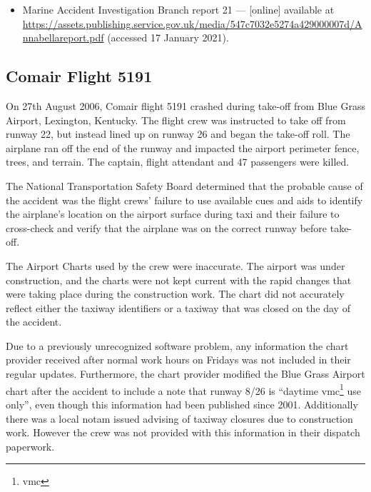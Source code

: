 \begin{itemize}
\item Marine Accident Investigation Branch report 21 ---  [online] available at \href{https://assets.publishing.service.gov.uk/media/547c7032e5274a429000007d/Annabellareport.pdf}{https://assets.publishing.service.gov.uk/media/547c7032e5274a429000007d/Annabellareport.pdf} (accessed 17 January 2021).
\end{itemize}

\subsection{Comair Flight 5191} \label{bkm:incacc:comair5191}
On 27th August 2006, Comair flight 5191 crashed during take-off from Blue Grass Airport, Lexington, Kentucky. The flight crew was instructed to take off from runway 22, but instead lined up on runway 26 and began the take-off roll. The airplane ran off the end of the runway and impacted the airport perimeter fence, trees, and terrain. The captain, flight attendant and 47 passengers were killed.

The National Transportation Safety Board determined that the probable cause of the accident was the flight crews' failure to use available cues and aids to identify the airplane's location on the airport surface during taxi and their failure to cross-check and verify that the airplane was on the correct runway before take-off.

The Airport Charts used by the crew were inaccurate. The airport was under construction, and the charts were not kept current with the rapid changes that were taking place during the construction work. The chart did not accurately reflect either the taxiway identifiers or a taxiway that was closed on the day of the accident.

Due to a previously unrecognized software problem, any \gls{information} the chart provider received after normal work hours on Fridays was not included in their regular updates. Furthermore, the chart provider modified the Blue Grass Airport chart after the accident to include a note that runway 8/26 is ``daytime \acrshort{vmc}\footnote{\acrlong{vmc}} use only'', even though this \gls{information} had been published since 2001. Additionally there was a local \gls{notam} issued advising of taxiway closures due to construction work. However the crew was not provided with this \gls{information} in their dispatch paperwork.

